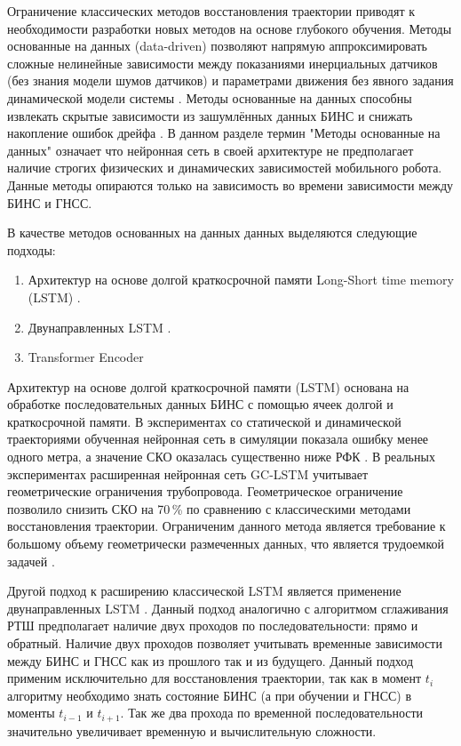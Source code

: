 Ограничение классических методов восстановления траектории приводят к необходимости разработки новых методов на основе глубокого обучения. Методы  основанные на данных (data-driven) позволяют напрямую аппроксимировать сложные нелинейные зависимости между показаниями инерциальных датчиков (без знания модели шумов датчиков) и параметрами движения без явного задания динамической модели системы \cite{Almassri2022, Sun2025}. Методы основанные на данных способны извлекать скрытые зависимости из зашумлённых данных БИНС и снижать накопление ошибок дрейфа \cite{Yugay2025, Molina-Leal2021}. В данном разделе термин "Методы основанные на данных"  означает что нейронная сеть в своей архитектуре не предполагает наличие строгих физических и динамических зависимостей мобильного робота. Данные методы опираются только на зависимость во времени зависимости между БИНС и ГНСС. 

В качестве методов основанных на данных данных выделяются следующие подходы:
\begin{enumerate}
	\item Архитектур на основе долгой краткосрочной памяти Long-Short time memory (LSTM) \cite{Almassri2022}.
	\item Двунаправленных LSTM \cite{Niu2026}.
	\item Transformer Encoder \cite{Guyard2025}
\end{enumerate}	

Архитектур на основе долгой краткосрочной памяти (LSTM) \cite{Almassri2022}
основана на обработке последовательных данных БИНС с помощью ячеек долгой и краткосрочной памяти. В экспериментах со статической и динамической траекториями обученная нейронная сеть в симуляции показала ошибку менее одного метра, а значение СКО оказалась существенно ниже РФК \cite{Wu2021}. В реальных экспериментах расширенная нейронная сеть GC-LSTM \cite{Molina-Leal2021} учитывает геометрические ограничения трубопровода. Геометрическое ограничение позволило снизить СКО на 70\,\% по сравнению с классическими методами восстановления траектории. Ограниченим данного метода является требование к большому объему геометрически размеченных данных, что является трудоемкой задачей \cite{Yugay2025}. 

Другой подход к расширению классической LSTM является применение двунаправленных LSTM \cite{Chen2022}. Данный подход аналогично с алгоритмом сглаживания РТШ предполагает наличие двух проходов по последовательности: прямо и обратный. Наличие двух проходов позволяет учитывать временные зависимости между БИНС и ГНСС как из прошлого так и из будущего. Данный подход применим исключительно для восстановления траектории, так как в момент \(t_{i}\) алгоритму необходимо знать состояние БИНС (а при обучении и ГНСС) в моменты \(t_{i-1}\) и \(t_{i+1}\). Так же два прохода по временной последовательности значительно увеличивает временную и вычислительную сложности. 


